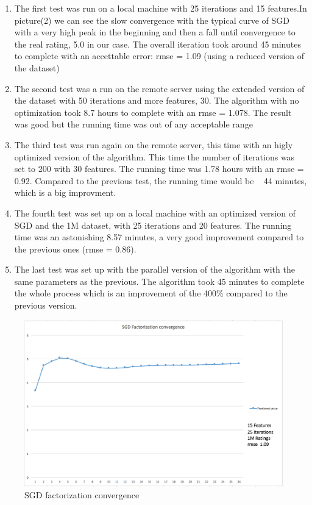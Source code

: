\documentclass{sig-alternate-05-2015}
\begin{document}
\begin{enumerate}
  \item The first test was run on a local machine with 25 iterations and 15 features.In picture(2) we can see the slow convergence with the typical curve of SGD with a
  very high peak in the beginning and then a fall until convergence to the real rating, 5.0 in our case. The overall iteration took around 45 minutes to complete with an
  accettable error: rmse = 1.09 (using a reduced version of the dataset)
  \item The second test was a run on the remote server using the extended version of the dataset with  50 iterations and more features, 30. The algorithm with no optimization
  took 8.7 hours to complete with an rmse = 1.078. The result was good but the running time was out of any acceptable range
  \item The third test was run again on the remote server, this time with an higly optimized version of the algorithm. This time the number of iterations was set to 200 with 30 features.
  The running time was 1.78 hours with an rmse = 0.92. Compared to the previous test, the running time would be ~ 44 minutes, which is a big improvment.
  \item The fourth test was set up on a local machine with an optimized version of SGD and the 1M dataset, with 25 iterations and 20 features. The running time was an astonishing 8.57 minutes,
  a very good improvement compared to the previous ones (rmse = 0.86).
  \item The last test was set up with the parallel version of the algorithm with the same parameters as the previous. The algorithm took 45 minutes to complete the whole process
  which is an improvement of the 400$\%$ compared to the previous version.
\end{enumerate}
\begin{figure}
    \caption{SGD factorization convergence}
    \centering
    \includegraphics[scale=0.175]{chart.png}
\end{figure}
\end{document}
